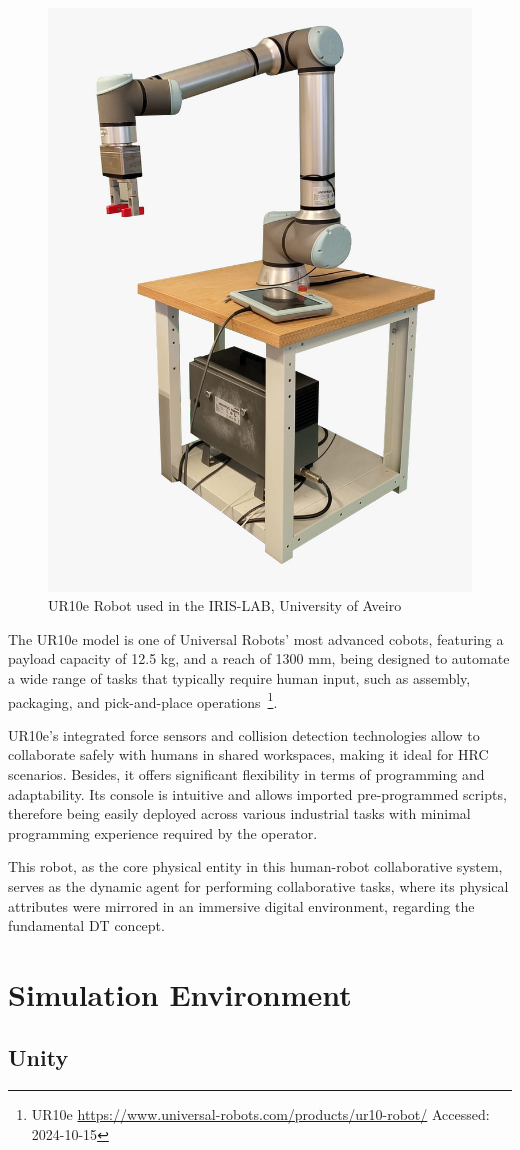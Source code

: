 \begin{figure}[h]
    \centering
    \includegraphics[width=0.4\linewidth]{figs/ur10e.jpeg}
    \caption{UR10e Robot used in the IRIS-LAB, University of Aveiro}
    \label{f:ur10e_iris}
\end{figure}

The UR10e model is one of Universal Robots' most advanced cobots, featuring a payload capacity of 12.5 kg, and a reach of 1300 mm, being designed to automate a wide range of tasks that typically require human input, such as assembly, packaging, and pick-and-place operations~\footnote{UR10e \url{https://www.universal-robots.com/products/ur10-robot/} Accessed: 2024-10-15}.

UR10e's integrated force sensors and collision detection technologies allow to collaborate safely with humans in shared workspaces, making it ideal for \ac{HRC} scenarios. Besides, it offers significant flexibility in terms of programming and adaptability. Its console is intuitive and allows imported pre-programmed scripts, therefore being easily deployed across various industrial tasks with minimal programming experience required by the operator.

This robot, as the core physical entity in this human-robot collaborative system, serves as the dynamic agent for performing collaborative tasks, where its physical attributes were mirrored in an immersive digital environment, regarding the fundamental \ac{DT} concept.

\section{Simulation Environment}

\subsection{Unity}

